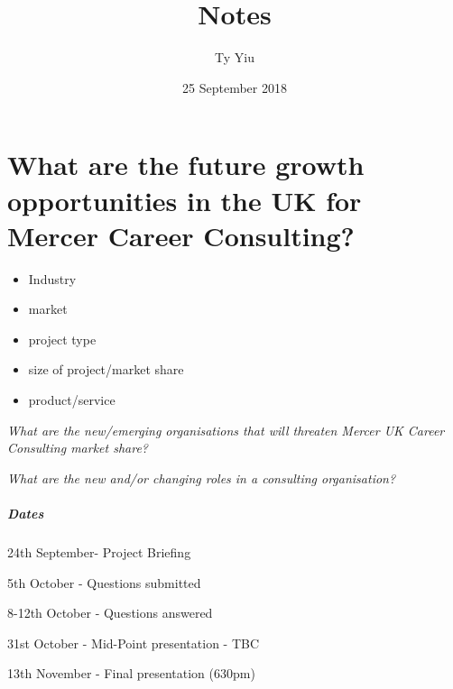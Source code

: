 \documentclass{article}
\author{Ty Yiu}                                 %
\title{Notes}                           %
\date{25 September 2018}
\begin{document}
\maketitle                                        %
\clearpage

\section{
What are the future growth opportunities in the UK for Mercer Career Consulting? 
}

\begin{itemize}
\item Industry
\item market
\item project type
\item size of project/market share
\item product/service
\end{itemize}
 
\textit{What are the new/emerging organisations that will threaten Mercer UK Career Consulting market share?}

\textit{What are the new and/or changing roles in a consulting organisation?}

\subparagraph{Dates}
24th September- Project Briefing

5th October - Questions submitted

8-12th October - Questions answered

31st October - Mid-Point presentation - TBC

13th November - Final presentation (630pm)
\end{document}
